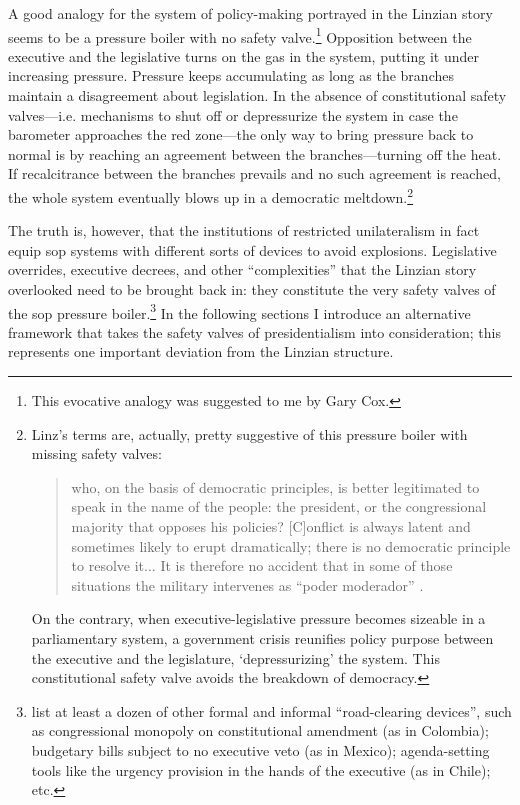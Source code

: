 A good analogy for the system of policy-making portrayed in the Linzian story seems to be a pressure boiler with no safety valve.\footnote{This evocative analogy was suggested to me by Gary Cox.}  Opposition between the executive and the legislative turns on the gas in the system, putting it under increasing pressure.  Pressure keeps accumulating as long as the branches maintain a disagreement about legislation.  In the absence of constitutional safety valves---i.e. mechanisms to shut off or depressurize the system in case the barometer approaches the red zone---the only way to bring pressure back to normal is by reaching an agreement between the branches---turning off the heat.  If recalcitrance between the branches prevails and no such agreement is reached, the whole system eventually blows up in a democratic meltdown.\footnote{Linz's terms are, actually, pretty suggestive of this pressure boiler with missing safety valves: \begin{quote}who, on the basis of democratic principles, is better legitimated to speak in the name of the people: the president, or the congressional majority that opposes his policies?  [C]onflict is always latent and sometimes likely to erupt dramatically; there is no democratic principle to resolve it$\ldots$  It is therefore no accident that in some of those situations the military intervenes as ``poder moderador'' \citeyearpar[][7]{linz.1994}.\end{quote} On the contrary, when executive-legislative pressure becomes sizeable in a parliamentary system, a government crisis reunifies policy purpose between the executive and the legislature, ‘depressurizing' the system.  This constitutional safety valve avoids the breakdown of democracy.}

The truth is, however, that the institutions of restricted unilateralism in fact equip sop systems with different sorts of devices to avoid explosions.  Legislative overrides, executive decrees, and other ``complexities'' that the Linzian story overlooked need to be brought back in: they constitute the very safety valves of the sop pressure boiler.\footnote{\citet{domingo.morgenstern.nd} list at least a dozen of other formal and informal ``road-clearing devices'', such as congressional monopoly on constitutional amendment (as in Colombia); budgetary bills subject to no executive veto (as in Mexico); agenda-setting tools like the urgency provision in the hands of the executive (as in Chile); etc.}  In the following sections I introduce an alternative framework that takes the safety valves of presidentialism into consideration; this represents one important deviation from the Linzian structure.  

